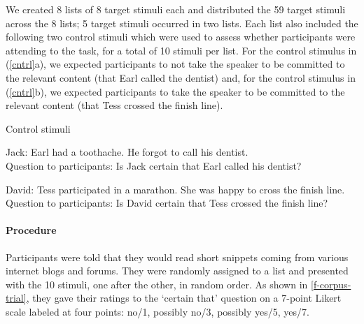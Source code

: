 \documentclass[11pt,fleqn]{article}
\newcommand{\6}{\mbox{$[\hspace*{-.6mm}[$}}
\newcommand{\9}{\mbox{$]\hspace*{-.6mm}]$}}
\begin{document}
We created 8 lists of 8 target stimuli each and distributed the 59 target stimuli across the 8 lists; 5 target stimuli occurred in two lists. Each list also included the following
two control stimuli which were used to assess whether
participants were attending to the task, for a total of 10 stimuli per list. For the control stimulus in (\ref{cntrl}a), we expected participants to not take the speaker to be committed to the relevant content (that Earl called the dentist) and, for the control stimulus in (\ref{cntrl}b), we expected participants to take the speaker to be committed to the relevant content (that Tess crossed the finish line).

\begin{exe}
\ex\label{cntrl} Control stimuli
\begin{xlist}
\ex Jack: Earl had a toothache. He forgot to call his dentist. \\ Question to participants: Is Jack certain that Earl called his dentist?

\ex  David: Tess participated in a marathon. She was happy to cross
the finish line. \\ Question to participants: Is David certain that Tess
crossed the finish line? \end{xlist} \end{exe}

\paragraph{Procedure} Participants were told that they would read short snippets coming from various internet blogs and forums. They were randomly assigned to a list and presented with the 10 stimuli, one after the other, in random order. As shown in \ref{f-corpus-trial}, they gave their ratings to the `certain that' question on a 7-point Likert scale labeled at four points: no/1, possibly no/3, possibly yes/5, yes/7.
\end{document}
